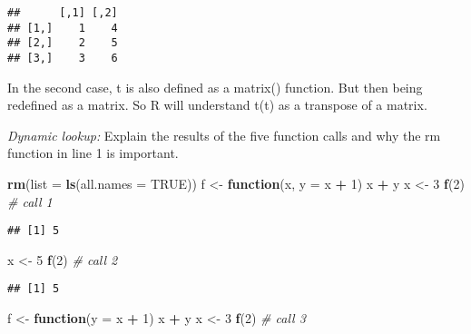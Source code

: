 \documentclass[12,]{article}
\newenvironment{Shaded}{\begin{snugshade}}{\end{snugshade}}
\newcommand{\KeywordTok}[1]{\textcolor[rgb]{0.13,0.29,0.53}{\textbf{#1}}}
\newcommand{\DataTypeTok}[1]{\textcolor[rgb]{0.13,0.29,0.53}{#1}}
\newcommand{\DecValTok}[1]{\textcolor[rgb]{0.00,0.00,0.81}{#1}}
\newcommand{\StringTok}[1]{\textcolor[rgb]{0.31,0.60,0.02}{#1}}
\newcommand{\CommentTok}[1]{\textcolor[rgb]{0.56,0.35,0.01}{\textit{#1}}}
\newcommand{\OtherTok}[1]{\textcolor[rgb]{0.56,0.35,0.01}{#1}}
\newcommand{\ControlFlowTok}[1]{\textcolor[rgb]{0.13,0.29,0.53}{\textbf{#1}}}
\newcommand{\OperatorTok}[1]{\textcolor[rgb]{0.81,0.36,0.00}{\textbf{#1}}}
\newcommand{\NormalTok}[1]{#1}
\begin{document}
\begin{verbatim}
##      [,1] [,2]
## [1,]    1    4
## [2,]    2    5
## [3,]    3    6
\end{verbatim}

In the second case, t is also defined as a matrix() function. But then
being redefined as a matrix. So R will understand t(t) as a transpose of
a matrix.

\emph{Dynamic lookup:} Explain the results of the five function calls
and why the rm function in line 1 is important.

\begin{Shaded}
\begin{Highlighting}[]
\KeywordTok{rm}\NormalTok{(}\DataTypeTok{list =} \KeywordTok{ls}\NormalTok{(}\DataTypeTok{all.names =} \OtherTok{TRUE}\NormalTok{))}
\NormalTok{f <-}\StringTok{ }\ControlFlowTok{function}\NormalTok{(x, }\DataTypeTok{y =}\NormalTok{ x }\OperatorTok{+}\StringTok{ }\DecValTok{1}\NormalTok{) x }\OperatorTok{+}\StringTok{ }\NormalTok{y }
\NormalTok{x <-}\StringTok{ }\DecValTok{3}
\KeywordTok{f}\NormalTok{(}\DecValTok{2}\NormalTok{) }\CommentTok{# call 1}
\end{Highlighting}
\end{Shaded}

\begin{verbatim}
## [1] 5
\end{verbatim}

\begin{Shaded}
\begin{Highlighting}[]
\NormalTok{x <-}\StringTok{ }\DecValTok{5}
\KeywordTok{f}\NormalTok{(}\DecValTok{2}\NormalTok{) }\CommentTok{# call 2}
\end{Highlighting}
\end{Shaded}

\begin{verbatim}
## [1] 5
\end{verbatim}

\begin{Shaded}
\begin{Highlighting}[]
\NormalTok{f <-}\StringTok{ }\ControlFlowTok{function}\NormalTok{(}\DataTypeTok{y =}\NormalTok{ x }\OperatorTok{+}\StringTok{ }\DecValTok{1}\NormalTok{) x }\OperatorTok{+}\StringTok{ }\NormalTok{y }
\NormalTok{x <-}\StringTok{ }\DecValTok{3}
\KeywordTok{f}\NormalTok{(}\DecValTok{2}\NormalTok{) }\CommentTok{# call 3}
\end{Highlighting}
\end{Shaded}
\end{document}
